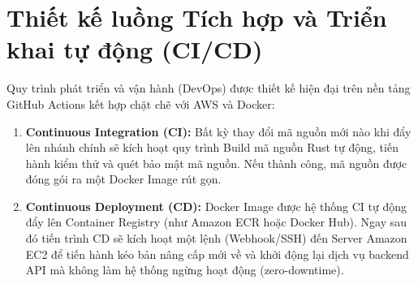 \section{Thiết kế luồng Tích hợp và Triển khai tự động (CI/CD)}

Quy trình phát triển và vận hành (DevOps) được thiết kế hiện đại trên nền tảng GitHub Actions kết hợp chặt chẽ với AWS và Docker:
\begin{enumerate}
    \item \textbf{Continuous Integration (CI):} Bất kỳ thay đổi mã nguồn mới nào khi đẩy lên nhánh chính sẽ kích hoạt quy trình Build mã nguồn Rust tự động, tiến hành kiểm thử \cite{RustTesting} và quét bảo mật mã nguồn. Nếu thành công, mã nguồn được đóng gói ra một Docker Image \cite{Docker} rút gọn.
    \item \textbf{Continuous Deployment (CD):} Docker Image được hệ thống CI tự động đẩy lên Container Registry (như Amazon ECR hoặc Docker Hub). Ngay sau đó tiến trình CD sẽ kích hoạt một lệnh (Webhook/SSH) đến Server Amazon EC2 để tiến hành kéo bản nâng cấp mới về và khởi động lại dịch vụ backend API mà không làm hệ thống ngừng hoạt động (zero-downtime).
\end{enumerate}
